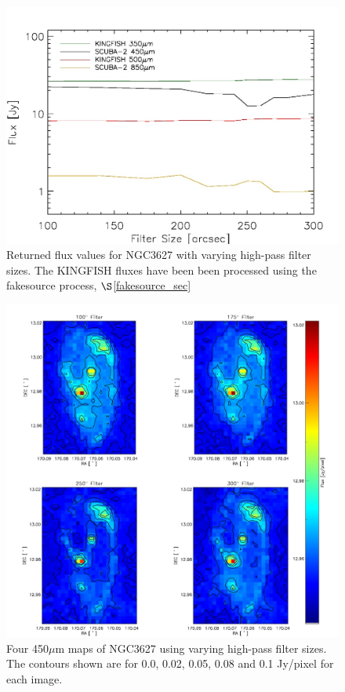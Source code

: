 \begin{figure}
  \centering
  \includegraphics[scale=0.65]{obs_imgs/flux_line.jpeg}
  \caption[Flux Values vs  High-Pass Filter Sizes]{Returned flux values for NGC3627 with varying high-pass filter sizes.  The KINGFISH fluxes have been been processed using the fakesource process, $\S$\ref{fakesource_sec}}
  \label{filt_lines}
\end{figure}

\begin{figure}
  \centering
  \includegraphics[scale=0.5]{obs_imgs/450_comparison_4.jpeg}
  \caption[450$\mu$m High-Pass Filter Images]{Four 450$\mu$m maps of NGC3627 using varying high-pass filter sizes.  The contours shown are for 0.0, 0.02, 0.05, 0.08 and 0.1 Jy/pixel for each image.}
    \label{450_flt}
\end{figure}

